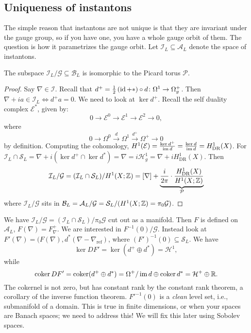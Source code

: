 \subsection{Uniqueness of instantons}
The simple reason that instantons are not unique is that they are invariant under the gauge group, so if you have one, you have a whole gauge orbit of them. The question is how it parametrizes the gauge orbit. Let $\mathcal I_L \subseteq \mathcal A_L$ denote the space of instantons.
\begin{prop}
    The subspace $\mathcal I_L / \mathcal G \subseteq  \mathcal B_L$ is isomorphic to the Picard torus $\mathcal P$.
\end{prop}
\begin{proof}
    Say $\nabla \in  \mathcal I$. Recall that $d^+ =\frac{1}{2}\left( \operatorname{id} + * \right) \circ d\colon \Omega^1  \to \Omega^+_g$. Then $\nabla + ia \in  \mathcal I_L \iff d^+ a = 0$. We need to look at $\ker d^+$. Recall the self duality complex $\mathcal E^*$, given by: \[
    0 \to \mathcal E^0 \to  \mathcal E^1 \to  \mathcal E^2 \to 0, 
    \] where \[
    0 \to \Omega^0 \xrightarrow d \Omega^1\xrightarrow{d^+} \Omega^+ \to 0
\] by definition. Computing the cohomology, $H^1(\mathcal E) = \frac{\ker d^+}{\operatorname{im} d}=\frac{\ker d}{\operatorname{im} d}= H^1_{\mathrm{DR}}(X)$. For $\mathcal I_L \cap  \mathcal S_L = \nabla  + i (\ker d^+ \cap  \ker d^*) = \nabla = i \mathcal H^1_g = \nabla + i H^1_{\mathrm{DR}}(X)$. Then \[
\mathcal I_L / \mathcal G = (\mathcal I_L \cap  \mathcal S_L) / H^1 (X ; \mathbb{Z}) = [\nabla] + \underset{\mathcal P}{\underbrace{\frac{i}{2\pi}\cdot \frac{H^1_{\mathrm{DR}}(X)}{H^1(X;\mathbb{Z})}}
} \] where $\mathcal I_L / \mathcal G$ sits in $\mathcal B_L = \mathcal A_L / \mathcal G = \mathcal S_L / (H^1(X;\mathbb{Z})=\pi_0\mathcal G)$.
\end{proof} 
We have $\mathcal I_L / \mathcal G = (\mathcal I_ L \cap \mathcal S_L) / \pi_0 \mathcal G$ cut out as a manifold. Then $F$ is defined on $\mathcal A_L$, $F(\nabla) = F_{\nabla}^+$. We are interested in $F^{-1}(0) / \mathcal G$. Instead look at $F'(\nabla) = (F(\nabla), d^*(\nabla - \nabla _{\mathrm{ref}})$, where $(F')^{-1}(0) \subseteq \mathcal S_L$. We have \[
    \ker DF' = \ker (d^+ \oplus d^*) = \mathcal H^1,
\] while \[
\operatorname{coker} DF' = \operatorname{coker} (d^+ \oplus d^*) = \Omega^+/\operatorname{im} d\oplus \operatorname{coker} d^* = \mathcal H^+ \oplus \mathbb{R}.
\] The cokernel is not zero, but has constant rank by the constant rank theorem, a corollary of the inverse function theorem. ${ F'} ^{-1}(0)$ is a \emph{clean} level set, i.e., submanifold of a domain. This is true in finite dimensions, or when your spaces are Banach spaces; we need to address this! We will fix this later using Sobolev spaces.

